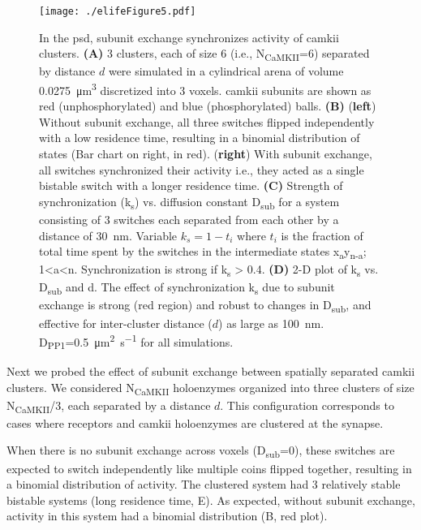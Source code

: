 \documentclass[9pt,lineno,doublespacing]{elife}
\newcommand\SUB[2]{#1\textsubscript{#2}}
\begin{document}
\begin{figure}%
    \texttt{[image: ./elifeFigure5.pdf]}
    \caption{In the \gls{psd}, subunit exchange synchronizes activity of
        \gls{camkii} clusters. 
        \textbf{(A)} 3 clusters, each of size 6 (i.e.,
        \SUB{N}{CaMKII}=6) separated by distance \(d\) were simulated in a
        cylindrical arena of volume \SI{0.0275}{\micro\meter^3} discretized
        into 3 voxels. \Gls{camkii} subunits are shown as red 
        (unphosphorylated) and blue (phosphorylated) balls. 
        \textbf{(B)} (\textbf{left}) Without subunit exchange, all three
        switches flipped independently with a low residence time, resulting in a
        binomial distribution of states (Bar chart on right, in red). (\textbf{right})
        With subunit exchange, all switches synchronized their activity i.e.,
        they acted as a single bistable switch with a longer residence time.
        \textbf{(C)} Strength of synchronization (\SUB{k}{s})
        vs. diffusion constant \SUB{D}{sub} for a system consisting of 3 switches
        each separated from each other by a distance of \SI{30}{\nano \meter}.
        Variable $k_s=1-t_i$ where $t_i$ is the fraction of total time spent by
        the switches in the intermediate states
        x\textsubscript{a}y\textsubscript{n-a}; 1\textless{}a\textless{}n.
        Synchronization is strong if k\textsubscript{s} \textgreater{} 0.4.
        \textbf{(D)} 2-D plot of \SUB{k}{s} vs. \SUB{D}{sub} and d. The effect
        of synchronization \SUB{k}{s} due to subunit exchange is strong (red
        region) and robust to changes in \SUB{D}{sub}, and effective for
        inter-cluster distance ($d$) as large as \SI{100}{\nano\meter}. 
        \SUB{D}{PP1}=\SI{0.5}{\micro\meter\squared\per\second} for all
        simulations.
    }\label{fig:sync_spread}
\end{figure}

Next we probed the effect of subunit exchange between spatially separated
\gls{camkii} clusters. We considered \SUB{N}{CaMKII} holoenzymes organized into
three clusters of size \SUB{N}{CaMKII}/3, each separated by a distance \(d\).
This configuration corresponds to cases where receptors and \gls{camkii}
holoenzymes are clustered at the synapse. 

When there is no subunit exchange across voxels (\SUB{D}{sub}=0), these switches
are expected to switch independently like multiple coins flipped together,
resulting in a binomial distribution of activity. The clustered system had 3
relatively stable bistable systems (long residence time, E). As
expected, without subunit exchange, activity in this system had a binomial
distribution (B, red plot). 
\end{document}
